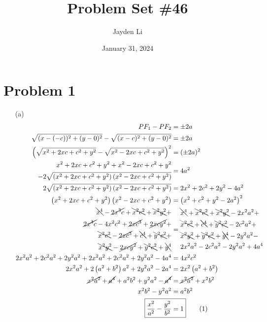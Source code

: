 \documentclass{article}
\title{Problem Set \#46}
\author{Jayden Li}
\date{January 31, 2024}
\begin{document}
\fontsize{12pt}{12pt}\selectfont

\maketitle

\section*{Problem 1}
\begin{itemize}
\item[(a)]
    \setlength{\abovedisplayskip}{0pt}
	\begin{align*}
        PF_1-PF_2&=\pm2a \\
		\sqrt{(x-(-c))^2+(y-0)^2}-\sqrt{(x-c)^2+(y-0)^2}&=\pm2a \\
		\left(\sqrt{x^2+2xc+c^2+y^2}-\sqrt{x^2-2xc+c^2+y^2}\right)^2&=(\pm2a)^2 \\
		\begin{aligned}
			x^2+2xc+c^2+y^2+x^2-2xc+c^2+y^2& \\
			-2\sqrt{\left(x^2+2xc+c^2+y^2\right)\left(x^2-2xc+c^2+y^2\right)}&
		\end{aligned}&=4a^2 \\
		2\sqrt{\left(x^2+2xc+c^2+y^2\right)\left(x^2-2xc+c^2+y^2\right)}&=2x^2+2c^2+2y^2-4a^2 \\
		\left(x^2+2xc+c^2+y^2\right)\left(x^2-2xc+c^2+y^2\right)&=\left(x^2+c^2+y^2-2a^2\right)^2 \\
		\begin{aligned}
			\bcancel{x^4}-\cancel{2x^3c}+\bcancel{x^2c^2}+\bcancel{x^2y^2}+& \\
			\cancel{2x^3c}-4x^2c^2+\cancel{2xc^3}+\cancel{2xcy^2}+& \\
			\bcancel{x^2c^2}-\cancel{2xc^3}+\bcancel{c^4}+\bcancel{y^2c^2}+& \\
			\bcancel{x^2y^2}-\cancel{2xcy^2}+\bcancel{y^2c^2}+\bcancel{y^4}&
		\end{aligned}&=
		\begin{aligned}
			&\bcancel{x^4}+\bcancel{x^2c^2}+\bcancel{x^2y^2}-2x^2a^2+ \\
			&\bcancel{x^2c^2}+\bcancel{c^4}+\bcancel{y^2c^2}-2c^2a^2+ \\
			&\bcancel{x^2y^2}+\bcancel{y^2c^2}+\bcancel{y^4}-2y^2a^2- \\
			&2x^2a^2-2c^2a^2-2y^2a^2+4a^4
		\end{aligned} \\
		2x^2a^2+2c^2a^2+2y^2a^2+2x^2a^2+2c^2a^2+2y^2a^2-4a^4&=4x^2c^2 \\
		2x^2a^2+2\left(a^2+b^2\right)a^2+2y^2a^2-2a^4&=2x^2\left(a^2+b^2\right) \\
		\cancel{x^2a^2}+\cancel{a^4}+a^2b^2+y^2a^2-\cancel{a^4}&=\cancel{x^2a^2}+x^2b^2 \\
		x^2b^2-y^2a^2&=a^2b^2 \\
		\Aboxed{\frac{x^2}{a^2}-\frac{y^2}{b^2}&=1} \tag{1}
    \end{align*}


\end{itemize}
\end{document}
